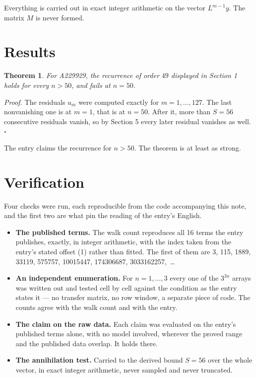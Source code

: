 \documentclass[11pt]{article}
\newtheorem{theorem}{Theorem}
\theoremstyle{definition}
\begin{document}
Everything is carried out in exact integer arithmetic on the vector $L^{m-1}y$. The matrix $M$ is never formed.

\section{Results}

\begin{theorem} For A229929, the recurrence of order $49$ displayed in Section 1 holds for every $n > 50$, and fails at $n = 50$.\end{theorem}

{\itshape Proof.} The residuals $u_m$ were computed exactly for $m = 1,\dots,127$. The last nonvanishing one is at $m = 1$, that is at $n = 50$. After it, more than $S = 56$ consecutive residuals vanish, so by Section 5 every later residual vanishes as well. $\square$

The entry claims the recurrence for $n > 50$. The theorem is at least as strong.

\section{Verification}

Four checks were run, each reproducible from the code accompanying this note, and the first two are what pin the reading of the entry's English.

\begin{itemize}

\item {\bfseries The published terms.} The walk count reproduces all 16 terms the entry publishes, exactly, in integer arithmetic, with the index taken from the entry's stated offset (1) rather than fitted. The first of them are 3, 115, 1889, 33119, 575757, 10015447, 174306687, 3033162257,~\dots

\item {\bfseries An independent enumeration.} For $n = 1,\dots,3$ every one of the $3^{3n}$ arrays was written out and tested cell by cell against the condition as the entry states it --- no transfer matrix, no row window, a separate piece of code. The counts agree with the walk count and with the entry.

\item {\bfseries The claim on the raw data.} Each claim was evaluated on the entry's published terms alone, with no model involved, wherever the proved range and the published data overlap. It holds there.

\item {\bfseries The annihilation test.} Carried to the derived bound $S = 56$ over the whole vector, in exact integer arithmetic, never sampled and never truncated.

\end{itemize}
\end{document}
